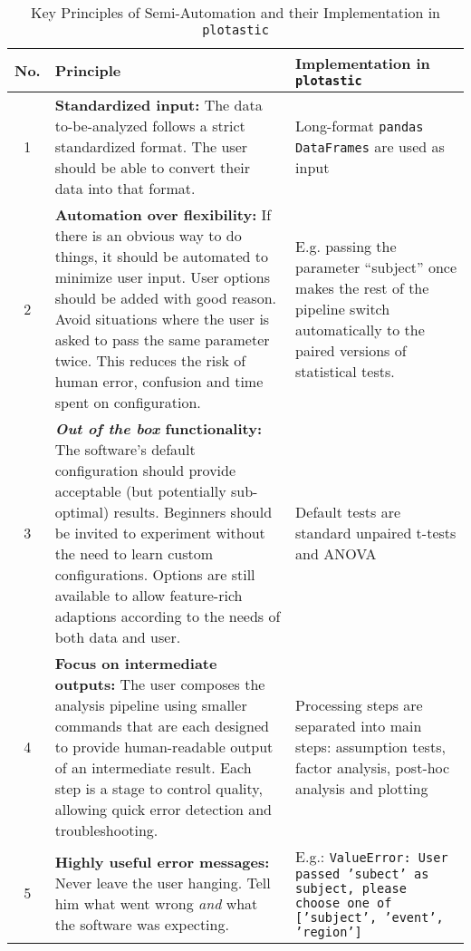 \begin{table}[h]
    \caption{Key Principles of Semi-Automation and their Implementation in \texttt{plotastic}}
    \footnotesize
    \centering
    \label{tab:semi-auto-principles}
    \begin{tabular}{|c|p{}|p{}|}
        \hline
        \textbf{No.}
         & \textbf{Principle}
         & \textbf{Implementation in \texttt{plotastic}}
        \\
        \hline
        1
         & \textbf{Standardized input:} The data to-be-analyzed follows a
        strict standardized format. The user should be able to convert their
        data into that format.
         & Long-format \texttt{pandas} \texttt{DataFrames} are used as input
        \\
        \hline
        2 & \textbf{Automation over flexibility:} If there is an obvious way to
         do things, it should be automated to minimize user input. User options
         should be added with good reason. Avoid situations where the user is
         asked to pass the same parameter twice. This reduces the risk of human
         error, confusion and time spent on configuration. & E.g. passing the
         parameter ``subject'' once makes the rest of the pipeline switch
         automatically to the paired versions of statistical tests. \\
        \hline
        3%
         & \textbf{\emph{Out of the box} functionality:} The software's
        default configuration should provide acceptable (but potentially
        sub-optimal) results. Beginners should be invited to experiment
        without the need to learn custom configurations. Options are still
        available to allow feature-rich adaptions according to the needs of
        both data and user.%
         & Default tests are standard unpaired t-tests and ANOVA             %
        \\%
        \hline
        4
         & \textbf{Focus on intermediate outputs:} The user composes the
        analysis pipeline using smaller commands that are each designed to
        provide human-readable output of an intermediate result. Each step
        is a stage to control quality, allowing quick error detection and
        troubleshooting.
         & Processing steps are separated into main steps:
        assumption tests, factor analysis, post-hoc analysis and plotting
        \\
        \hline
        5
         & \textbf{Highly useful error messages:} Never leave the user
        hanging. Tell him what went wrong \emph{and} what the software was
        expecting.
         & E.g.: \texttt{ValueError: User passed 'subect' as
        subject, please choose one of ['subject', 'event', 'region']}        \\
        \hline
    \end{tabular}
\end{table}

